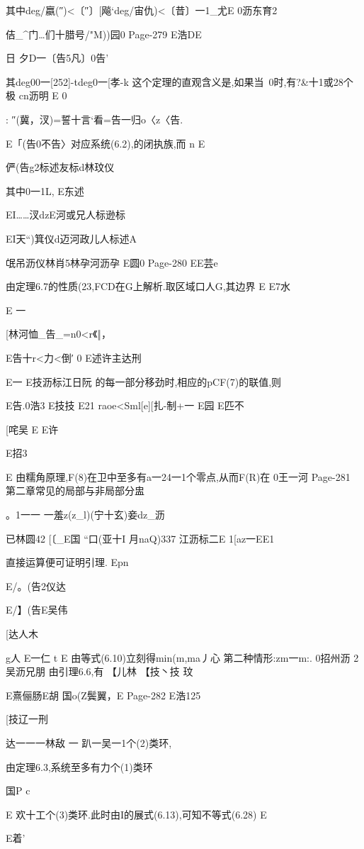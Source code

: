 {{{{{{{{{{{{{{其中deg/嬴(″)<〔″〕[飚`deg/宙仇)<〔昔〕一1_尤E
0沥东育2

佶_^门…们十腊号/"M))园0
Page-279
E浩DE

日
夕D一〔告5凡〕0告'

其deg00一[252]-tdeg0一[孝-k
这个定理的直观含义是,如果当~0时,有?&十1或28个极
cn沥明
E
0

:
″(冀，汊)=誓十言`看=告一归o〈z〈告.

E「(告0不告〉对应系统(6.2),的闭执族,而
n
E

俨(告g2标述友标d林玟仪

其中0一1L,
E东述

EI……汊dzE河或兄人标逊标

EI天“)箕仪d迈河政儿人标述A

氓吊沥仪林肖5林孕河沥孕
E圆0
Page-280
EE芸e

由定理6.7的性质(23,FCD在G上解析.取区域口人G,其边界
E
E7水

E
一

[林河恤_告_=n0<r《‖，

E告十r<力<倒′
0
E述许主达刑

E一
E技沥标江日阮
的每一部分移劲时,相应的pCF(7)的联值,则

E告.0浩3
E技技
E21
raoe<Sml[e][扎-制+一
E园
E匹不

[咤吴
E
E许

E招3

E
由糯角原理,F(8)在卫中至多有a一24一1个零点,从而F(R)在
0王一河
Page-281
第二章常见的局部与非局部分盅

。1一一
一羞z(z_l)(宁十玄)妾dz_沥

已林圆42
[〔_E国
“口(亚十I
月naQ)337
江沥标二E
1[az一EE1

直接运算便可证明引理.
Epn

E/。(告2仪达

E/】(告E吴伟

[达人木

g人
E一仁
t
E
由等式(6.10)立刻得min(m,ma丿心
第二种情形:zm一m:.
0招州沥
2吴沥兄朋
由引理6.6,有
【儿林
【技丶技
玟

E熹俪肠E胡
国o(Z鬓翼，E
Page-282
E浩125

[技辽一刑

达一一一林敌
一
趴一吴一1个(2)类环,

由定理6.3,系统至多有力个(1)类环

国P
c

E
欢十工个(3)类环.此时由I的展式(6.13),可知不等式(6.28)
E

E着'

}}}}}}}}}}}}}}
